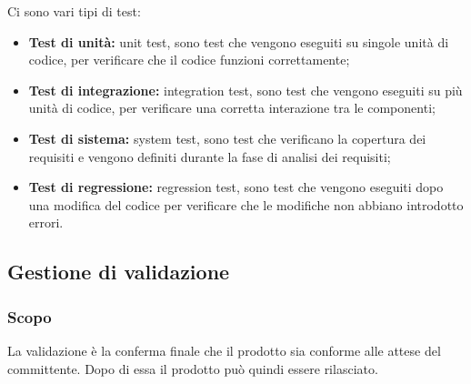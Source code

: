 Ci sono vari tipi di test:
\begin{itemize}
    \item \textbf{Test di unità:} unit test, sono test che vengono eseguiti su singole unità di codice, per verificare che il codice funzioni correttamente;
    \item \textbf{Test di integrazione:} integration test, sono test che vengono eseguiti su più unità di codice, per verificare una corretta interazione tra le componenti;
    \item \textbf{Test di sistema:} system test, sono test che verificano la copertura dei requisiti e vengono definiti durante la fase di analisi dei requisiti;
    \item \textbf{Test di regressione:} regression test, sono test che vengono eseguiti dopo una modifica del codice per verificare che le modifiche non abbiano introdotto errori.
\end{itemize}

\subsection{Gestione di validazione}
\subsubsection{Scopo} 
La validazione è la conferma finale che il prodotto sia conforme alle attese del committente. Dopo di essa il prodotto può quindi essere rilasciato.\\


